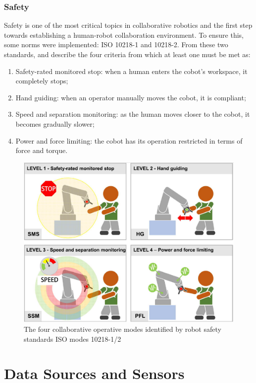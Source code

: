 \subsubsection{Safety}

Safety is one of the most critical topics in collaborative robotics and the first step towards establishing a human-robot collaboration environment. To ensure this, some norms were implemented: ISO 10218-1 and 10218-2. From these two standards, \textcite{Villani2018} and \textcite{Castro2021} describe the four criteria from which at least one must be met as:

\begin{enumerate}
  \item Safety-rated monitored stop: when a human enters the cobot's workspace, it completely stops;
  \item Hand guiding: when an operator manually moves the cobot, it is compliant;
  \item Speed and separation monitoring: as the human moves closer to the cobot, it becomes gradually slower;
  \item Power and force limiting: the cobot has its operation restricted in terms of force and torque.
\end{enumerate}

\begin{figure}[H]
\centerline{\includegraphics[width=4.5in]{figs/iso.png}}
\caption{The four collaborative operative modes identified by robot safety standards ISO modes 10218-1/2 \cite{Villani2018}}
\label{iso}
\end{figure}

\section{Data Sources and Sensors}

